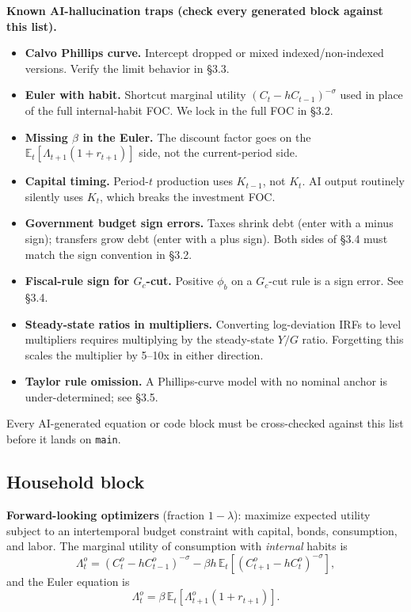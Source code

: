 \documentclass[11pt]{article}
\begin{document}
\begin{warningbox}
\textbf{Known AI-hallucination traps (check every generated block against this list).}
\begin{itemize}
    \item \textbf{Calvo Phillips curve.} Intercept dropped or mixed indexed/non-indexed versions. Verify the limit behavior in \S3.3.
    \item \textbf{Euler with habit.} Shortcut marginal utility $(C_t - hC_{t-1})^{-\sigma}$ used in place of the full internal-habit FOC. We lock in the full FOC in \S3.2.
    \item \textbf{Missing $\beta$ in the Euler.} The discount factor goes on the $\mathbb{E}_t[\Lambda_{t+1}(1+r_{t+1})]$ side, not the current-period side.
    \item \textbf{Capital timing.} Period-$t$ production uses $K_{t-1}$, not $K_t$. AI output routinely silently uses $K_t$, which breaks the investment FOC.
    \item \textbf{Government budget sign errors.} Taxes shrink debt (enter with a minus sign); transfers grow debt (enter with a plus sign). Both sides of \S3.4 must match the sign convention in \S3.2.
    \item \textbf{Fiscal-rule sign for $G_c$-cut.} Positive $\phi_b$ on a $G_c$-cut rule is a sign error. See \S3.4.
    \item \textbf{Steady-state ratios in multipliers.} Converting log-deviation IRFs to level multipliers requires multiplying by the steady-state $Y/G$ ratio. Forgetting this scales the multiplier by 5--10x in either direction.
    \item \textbf{Taylor rule omission.} A Phillips-curve model with no nominal anchor is under-determined; see \S3.5.
\end{itemize}
Every AI-generated equation or code block must be cross-checked against this list before it lands on \texttt{main}.
\end{warningbox}

\subsection{Household block}
\textbf{Forward-looking optimizers} (fraction $1-\lambda$): maximize expected utility subject to an intertemporal budget constraint with capital, bonds, consumption, and labor. The marginal utility of consumption with \emph{internal} habits is
\[
\Lambda_t^o = \left(C_t^o - h C_{t-1}^o\right)^{-\sigma} - \beta h\,\mathbb{E}_t\!\left[\left(C_{t+1}^o - h C_t^o\right)^{-\sigma}\right],
\]
and the Euler equation is
\[
\Lambda_t^o = \beta\,\mathbb{E}_t\!\left[\Lambda_{t+1}^o (1+r_{t+1})\right].
\]
\end{document}
